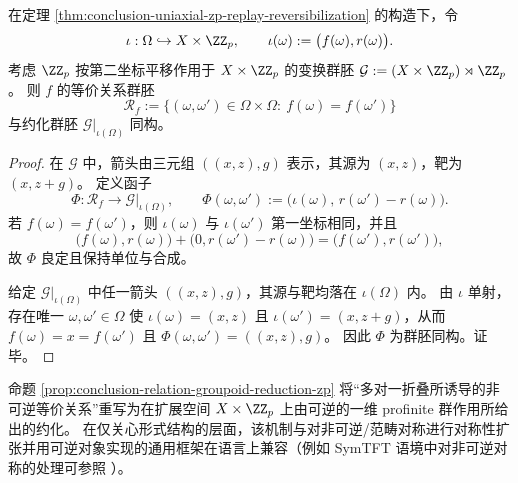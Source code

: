 \begin{proposition}[等价关系群胚的单轴可逆化约化]\label{prop:conclusion-relation-groupoid-reduction-zp}
在定理 \ref{thm:conclusion-uniaxial-zp-replay-reversibilization} 的构造下，令
\[
\iota:\Omega\hookrightarrow X\times \ZZ_p,\qquad \iota(\omega):=\bigl(f(\omega),r(\omega)\bigr).
\]
考虑 \(\ZZ_p\) 按第二坐标平移作用于 \(X\times \ZZ_p\) 的变换群胚
\(
\mathcal{G}:=(X\times \ZZ_p)\rtimes \ZZ_p
\)。
则 \(f\) 的等价关系群胚
\[
\mathcal{R}_f:=\{(\omega,\omega')\in\Omega\times\Omega:\ f(\omega)=f(\omega')\}
\]
与约化群胚 \(\mathcal{G}|_{\iota(\Omega)}\) 同构。
\end{proposition}
\begin{proof}
在 \(\mathcal{G}\) 中，箭头由三元组 \(((x,z),g)\) 表示，其源为 \((x,z)\)，靶为 \((x,z+g)\)。
定义函子
\[
\Phi:\mathcal{R}_f\to \mathcal{G}|_{\iota(\Omega)},\qquad
\Phi(\omega,\omega'):=\bigl(\iota(\omega),\,r(\omega')-r(\omega)\bigr).
\]
若 \(f(\omega)=f(\omega')\)，则 \(\iota(\omega)\) 与 \(\iota(\omega')\) 第一坐标相同，并且
\[
\bigl(f(\omega),r(\omega)\bigr)+\bigl(0,r(\omega')-r(\omega)\bigr)=\bigl(f(\omega'),r(\omega')\bigr),
\]
故 \(\Phi\) 良定且保持单位与合成。
\par
给定 \(\mathcal{G}|_{\iota(\Omega)}\) 中任一箭头 \(((x,z),g)\)，其源与靶均落在 \(\iota(\Omega)\) 内。
由 \(\iota\) 单射，存在唯一 \(\omega,\omega'\in\Omega\) 使 \(\iota(\omega)=(x,z)\) 且 \(\iota(\omega')=(x,z+g)\)，从而 \(f(\omega)=x=f(\omega')\) 且 \(\Phi(\omega,\omega')=((x,z),g)\)。
因此 \(\Phi\) 为群胚同构。证毕。
\end{proof}

\begin{remark}[与对称性扩张的形式接口]\label{rem:conclusion-zp-reversibilization-symmetry-extension}
命题 \ref{prop:conclusion-relation-groupoid-reduction-zp} 将“多对一折叠所诱导的非可逆等价关系”重写为在扩展空间 \(X\times \ZZ_p\) 上由可逆的一维 profinite 群作用所给出的约化。
在仅关心形式结构的层面，该机制与对非可逆/范畴对称进行对称性扩张并用可逆对象实现的通用框架在语言上兼容（例如 SymTFT 语境中对非可逆对称的处理可参照 \cite{SchaferNamekiTiwariWarmanZhang2025SymTFTMixedStatesNonInvertible}）。
\end{remark}

